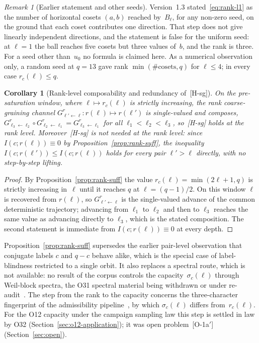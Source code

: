 \documentclass[11pt,a4paper]{article}
\theoremstyle{plain}
\newtheorem{corollary}[theorem]{Corollary}
\theoremstyle{definition}
\theoremstyle{remark}
\newtheorem{remark}[theorem]{Remark}
\begin{document}
  \begin{remark}[Earlier statement and other seeds]
    \label{rem:rank-seed}
    Version~1.3 stated~\eqref{eq:rank-l1} as the number of horizontal cosets $(a,b)$ reached
    by~$B_\ell$, for any non-zero seed, on the ground that each coset contributes one
    direction.
    That step does not give linearly independent directions, and the statement is false for
    the uniform seed: at $\ell = 1$ the ball reaches five cosets but three values of~$b$, and
    the rank is three.
    For a seed other than~$u_0$ no formula is claimed here.
    As a numerical observation only, a random seed at $q = 13$ gave rank
    $\min(\#\text{cosets}, q)$ for $\ell \leq 4$; in every case $r_c(\ell) \leq q$.
  \end{remark}

  \begin{corollary}[Rank-level composability and redundancy of~\textup{[H-sg]}]
    \label{cor:rank-sg}
    On the pre-saturation window, where $\ell \mapsto r_c(\ell)$ is strictly increasing,
    the rank coarse-graining channel $G^{r}_{\ell' \leftarrow \ell} : r(\ell) \mapsto r(\ell')$
    is single-valued and composes,
    $G^{r}_{\ell_3 \leftarrow \ell_2} \circ G^{r}_{\ell_2 \leftarrow \ell_1}
    = G^{r}_{\ell_3 \leftarrow \ell_1}$ for all $\ell_1 < \ell_2 < \ell_3$,
    so~\textup{[H-sg]} holds at the rank level.
    Moreover~\textup{[H-sg]} is not needed at the rank level:
    since $I(c; r(\ell)) \equiv 0$ by Proposition~\ref{prop:rank-suff},
    the inequality $I(c; r(\ell')) \leq I(c; r(\ell))$ holds for every pair $\ell' > \ell$
    directly, with no step-by-step lifting.
  \end{corollary}

  \begin{proof}
    By Proposition~\ref{prop:rank-suff} the value $r_c(\ell) = \min(2\ell+1, q)$ is strictly
    increasing in~$\ell$ until it reaches $q$ at $\ell = (q-1)/2$.
    On this window $\ell$ is recovered from $r(\ell)$, so $G^{r}_{\ell' \leftarrow \ell}$
    is the single-valued advance of the common deterministic trajectory;
    advancing from $\ell_1$ to $\ell_2$ and then to $\ell_3$ reaches the same value
    as advancing directly to $\ell_3$, which is the stated composition.
    The second statement is immediate from $I(c; r(\ell)) \equiv 0$ at every depth.
  \end{proof}

  Proposition~\ref{prop:rank-suff} supersedes the earlier pair-level observation that
  conjugate labels $c$ and $q-c$ behave alike, which is the special case of label-blindness
  restricted to a single orbit.
  It also replaces a spectral route, which is not available: no result of the corpus controls
  the capacity~$\sigma_c(\ell)$ through Weil-block spectra, the O31 spectral material being
  withdrawn or under re-audit~\cite{Beau2026a35}.
  The step from the rank to the capacity concerns the three-character fingerprint of the
  admissibility pipeline~\cite{Beau2026a16}, by which $\sigma_c(\ell)$ differs
  from~$r_c(\ell)$.
  For the O12 capacity under the campaign sampling law this step is settled in law by O32
  (Section~\ref{sec:o12-application}); it was open problem~\textup{[O-1a$'$]}
  (Section~\ref{sec:open}).
\end{document}
